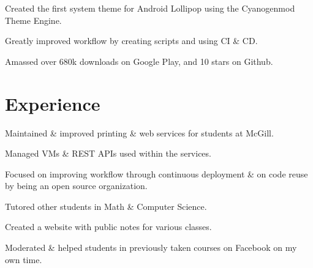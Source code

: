 \documentclass[]{allanwang-resume}
\begin{document}
\begin{minipage}[t]{0.66\textwidth}
	\begin{tightemize}
		\item Created the first system theme for Android Lollipop using the Cyanogenmod Theme Engine.
		\item Greatly improved workflow by creating scripts and using CI \& CD.
		\item Amassed over 680k downloads on Google Play, and 10 stars on Github.
	\end{tightemize}

	\sectionsep
	\section{Experience}

	\begin{tightemize}
		\item Maintained \& improved printing \& web services for students at McGill.
		\item Managed VMs \& REST APIs used within the services.
		\item Focused on improving workflow through continuous deployment \& on code reuse by being an open source organization.
	\end{tightemize}

	\begin{tightemize}
		\item Tutored other students in Math \& Computer Science.
		\item Created a website with public notes for various classes.
		\item Moderated \& helped students in previously taken courses on Facebook on my own time.
	\end{tightemize}

\end{minipage}
\end{document}
